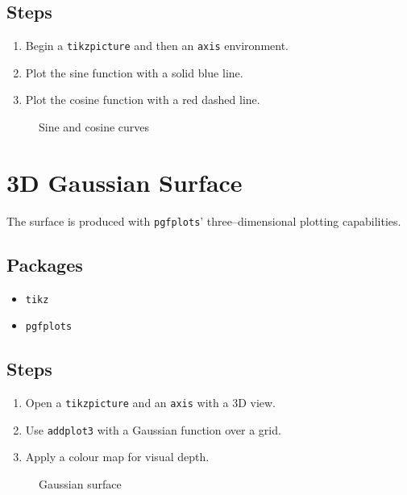 \documentclass{article}
\begin{document}
\subsection*{Steps}
\begin{enumerate}
    \item Begin a \texttt{tikzpicture} and then an \texttt{axis} environment.
    \item Plot the sine function with a solid blue line.
    \item Plot the cosine function with a red dashed line.
\end{enumerate}
\begin{figure}[h!]
    \centering
    \caption{Sine and cosine curves}
\end{figure}

\newpage

\section{3D Gaussian Surface}
The surface is produced with \texttt{pgfplots}' three--dimensional plotting capabilities.
\subsection*{Packages}
\begin{itemize}
    \item \texttt{tikz}
    \item \texttt{pgfplots}
\end{itemize}
\subsection*{Steps}
\begin{enumerate}
    \item Open a \texttt{tikzpicture} and an \texttt{axis} with a 3D view.
    \item Use \texttt{addplot3} with a Gaussian function over a grid.
    \item Apply a colour map for visual depth.
\end{enumerate}
\begin{figure}[h!]
    \centering
    \caption{Gaussian surface}
\end{figure}
\end{document}

